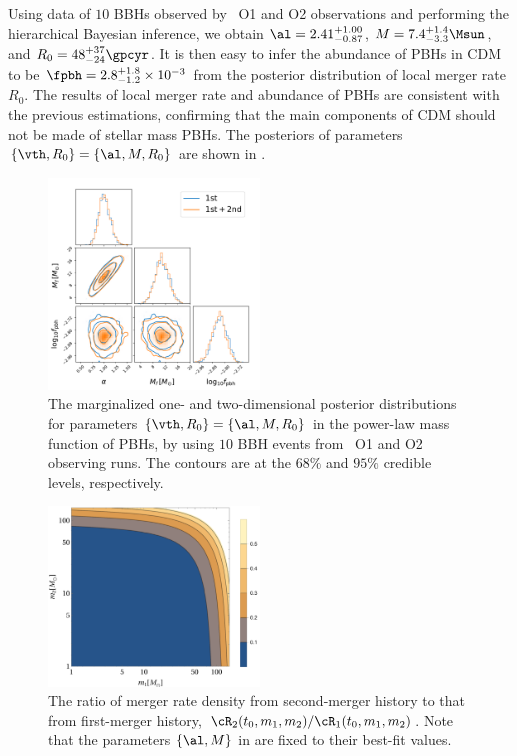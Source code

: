 \documentclass[twocolumn]{aastex631}
\begin{document}
Using data of $10$ BBHs observed by \lvc\ O1 and O2 observations and performing
the hierarchical Bayesian inference, we obtain $\al = 2.41^{+1.00}_{-0.87}$,
$M = 7.4^{+1.4}_{-3.3} \Msun$, and $R_0 = 48^{+37}_{-24} \gpcyr$.
It is then easy to infer the abundance of PBHs in CDM to be 
$\fpbh = 2.8^{+1.8}_{-1.2} \times 10^{-3}$ from the posterior distribution of local merger rate $R_0$.
The results of local merger rate and abundance of PBHs are consistent with
the previous estimations, confirming that the main components of CDM should
not be made of stellar mass PBHs.
The posteriors of parameters $\{\vth, R_0\} = \{\al, M, R_0\}$ are shown 
in .

\begin{figure}[htbp!]
	\centering
	\includegraphics[width=0.5\textwidth]{post-CC.pdf}
	\caption{\label{post-CC}
		The marginalized one- and two-dimensional posterior distributions for 
		parameters $\{\vth, R_0\} = \{\al, M, R_0\}$ in the power-law mass function 
		of PBHs, by using $10$ BBH events from \lvc\ O1 and O2 observing runs.
		The contours are at the $68\%$ and $95\%$ credible levels, respectively. 
	}
\end{figure}

\begin{figure}[htbp!]
	\centering
	\includegraphics[width=0.5\textwidth]{ratio-CC.pdf}
	\caption{\label{ratio-CC}
		The ratio of merger rate density from second-merger history
		to that from first-merger history,
		$\cR_2(t_0, m_1, m_2)/\cR_1(t_0, m_1, m_2)$. Note that the parameters $\{\al, M\}$ in  are fixed to their best-fit values.
	}
\end{figure}
\end{document}
